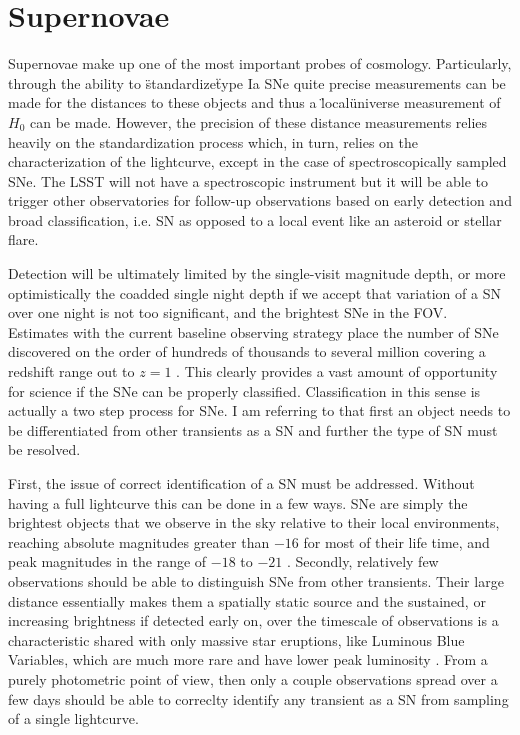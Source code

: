\documentclass[12pt]{article}
\begin{document}
\section{Supernovae} %
Supernovae make up one of the most important probes of cosmology. Particularly, through the ability to \"standardize\" type Ia SNe quite precise measurements can be made for the distances to these objects and thus a \"local\" universe measurement of $H_0$ can be made. However, the precision of these distance measurements relies heavily on the standardization process which, in turn, relies on the characterization of the lightcurve, except in the case of spectroscopically sampled SNe. The LSST will not have a spectroscopic instrument but it will be able to trigger other observatories for follow-up observations based on early detection and broad classification, i.e. SN as opposed to a local event like an asteroid or stellar flare. \par
Detection will be ultimately limited by the single-visit magnitude depth, or more optimistically the coadded single night depth if we accept that variation of a SN over one night is not too significant, and the brightest SNe in the FOV. Estimates with the current baseline observing strategy place the number of SNe discovered on the order of hundreds of thousands to several million covering a redshift range out to $z=1$ \citep{LSSTScienceCollaboration2017}. This clearly provides a vast amount of opportunity for science if the SNe can be properly classified. Classification in this sense is actually a two step process for SNe. I am referring to that first an object needs to be differentiated from other transients as a SN and further the type of SN must be resolved. \par
First, the issue of correct identification of a SN must be addressed. Without having a full lightcurve this can be done in a few ways. SNe are simply the brightest objects that we observe in the sky relative to their local environments, reaching absolute magnitudes greater than $-16$ for most of their life time, and peak magnitudes in the range of $-18$ to $-21$ \citep{LSSTScienceCollaboration2009}. Secondly, relatively few observations should be able to distinguish SNe from other transients. Their large distance essentially makes them a spatially static source and the sustained, or increasing brightness if detected early on, over the timescale of observations is a characteristic shared with only massive star eruptions, like Luminous Blue Variables, which are much more rare and have lower peak luminosity \citep{LSSTScienceCollaboration2017}. From a purely photometric point of view, then only a couple observations spread over a few days should be able to correclty identify any transient as a SN from sampling of a single lightcurve. \par
\end{document}
